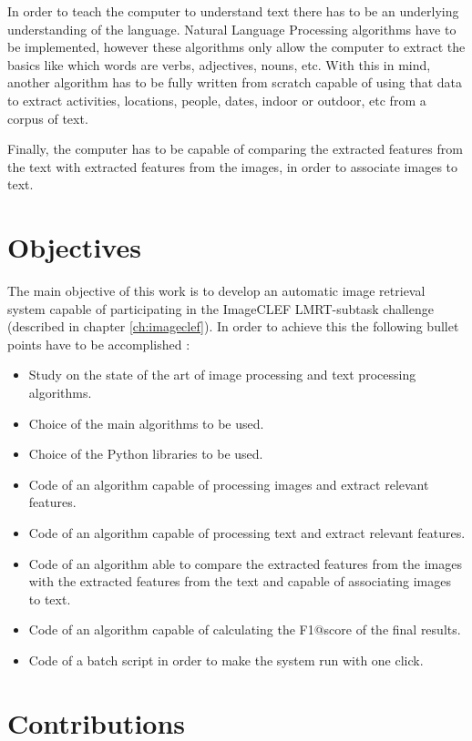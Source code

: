 In order to teach the computer to understand text there has to be an underlying understanding of the language. Natural Language Processing algorithms have to be implemented, however these algorithms only allow the computer to extract the basics like which words are verbs, adjectives, nouns, etc. With this in mind, another algorithm has to be fully written from scratch capable of using that data to extract activities, locations, people, dates, indoor or outdoor, etc from a corpus of text.

Finally, the computer has to be capable of comparing the extracted features from the text with extracted features from the images, in order to associate images to text.

\section{Objectives}

The main objective of this work is to develop an automatic image retrieval system capable of participating in the ImageCLEF LMRT-subtask challenge (described in chapter \ref{ch:imageclef}). In order to achieve this the following bullet points have to be accomplished :

\begin{itemize}
    \item Study on the state of the art of image processing and text processing algorithms.
    \item Choice of the main algorithms to be used.
    \item Choice of the Python libraries to be used.
    \item Code of an algorithm capable of processing images and extract relevant features.
    \item Code of an algorithm capable of processing text and extract relevant features.
    \item Code of an algorithm able to compare the extracted features from the images with the extracted features from the text and capable of associating images to text.
    \item Code of an algorithm capable of calculating the F1@score of the final results.
    \item Code of a batch script in order to make the system run with one click.
  \end{itemize}


\section{Contributions}

